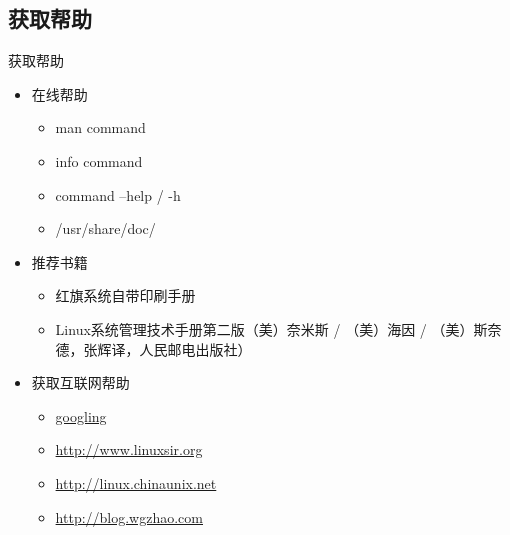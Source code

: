 \subsection{获取帮助}


\begin{frame}{获取帮助}
\begin{itemize}
\item 在线帮助

\begin{itemize}
\item man command
\item info command
\item command --help / -h
\item /usr/share/doc/
\end{itemize}
\item 推荐书籍

\begin{itemize}
\item 红旗系统自带印刷手册
\item Linux系统管理技术手册第二版（美）奈米斯 / （美）海因 / （美）斯奈德，张辉译，人民邮电出版社）
\end{itemize}
\item 获取互联网帮助

\begin{itemize}
\item \href{http://www.google.com.hk}{googling}
\item \href{http://www.linuxsir.org}{http://www.linuxsir.org}
\item \href{http://linux.chinaunix.net}{http://linux.chinaunix.net}
\item \href{http://blog.wgzhao.com}{http://blog.wgzhao.com}
\end{itemize}
\end{itemize}

\end{frame}

